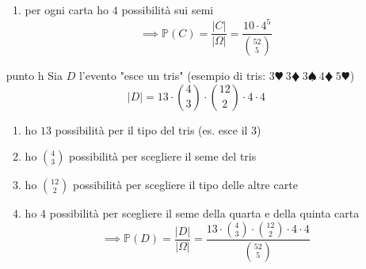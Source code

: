 \begin{enumerate}
\begin{enumerate}
\item per ogni carta ho $4$ possibilità sui semi\begin{equation*}
\implies \mathbb{P}( C) =\frac{| C| }{| \Omega | } =\frac{10\cdot 4^{5}}{\binom{52}{5}}
\end{equation*}
\end{enumerate}
\item [punto h] Sia $D$ l'evento "esce un tris" (esempio di tris: $3\varheartsuit \ 3\vardiamondsuit \ 3\spadesuit \ 4\vardiamondsuit \ 5\varheartsuit $)\begin{equation*}
| D| =13\cdot \binom{4}{3} \cdot \binom{12}{2} \cdot 4\cdot 4
\end{equation*}
\begin{enumerate}
\item ho $13$ possibilità per il tipo del tris (es. esce il $3$)
\item ho $\binom{4}{3}$ possibilità per scegliere il seme del tris
\item ho $\binom{12}{2}$ possibilità per scegliere il tipo delle altre carte
\item ho $4$ possibilità per scegliere il seme della quarta e della quinta carta\begin{equation*}
\implies \mathbb{P}( D) =\frac{| D| }{| \Omega | } =\frac{13\cdot \binom{4}{3} \cdot \binom{12}{2} \cdot 4\cdot 4}{\binom{52}{5}}
\end{equation*}
\end{enumerate}
\end{enumerate}

